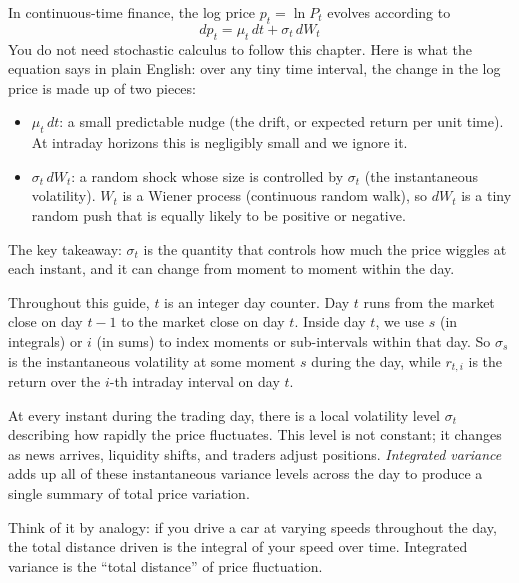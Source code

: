 \begin{prereq}
In continuous-time finance, the log price $p_t = \ln P_t$ evolves according to
\[
  dp_t = \mu_t\,dt + \sigma_t\,dW_t
\]
You do not need stochastic calculus to follow this chapter.
Here is what the equation says in plain English: over any tiny time interval, the change in the log price is made up of two pieces:
\begin{itemize}[nosep]
  \item $\mu_t\,dt$: a small predictable nudge (the drift, or expected return per unit time). At intraday horizons this is negligibly small and we ignore it.
  \item $\sigma_t\,dW_t$: a random shock whose size is controlled by $\sigma_t$ (the instantaneous volatility). $W_t$ is a Wiener process (continuous random walk), so $dW_t$ is a tiny random push that is equally likely to be positive or negative.
\end{itemize}
The key takeaway: $\sigma_t$ is the quantity that controls how much the price wiggles at each instant, and it can change from moment to moment within the day.
\end{prereq}

\begin{prereq}
Throughout this guide, $t$ is an integer day counter.
Day $t$ runs from the market close on day $t-1$ to the market close on day $t$.
Inside day $t$, we use $s$ (in integrals) or $i$ (in sums) to index moments or sub-intervals within that day.
So $\sigma_s$ is the instantaneous volatility at some moment $s$ during the day, while $r_{t,i}$ is the return over the $i$-th intraday interval on day $t$.
\end{prereq}

At every instant during the trading day, there is a local volatility level $\sigma_t$ describing how rapidly the price fluctuates.
This level is not constant; it changes as news arrives, liquidity shifts, and traders adjust positions.
\emph{Integrated variance} adds up all of these instantaneous variance levels across the day to produce a single summary of total price variation.

Think of it by analogy: if you drive a car at varying speeds throughout the day, the total distance driven is the integral of your speed over time.
Integrated variance is the ``total distance'' of price fluctuation.

